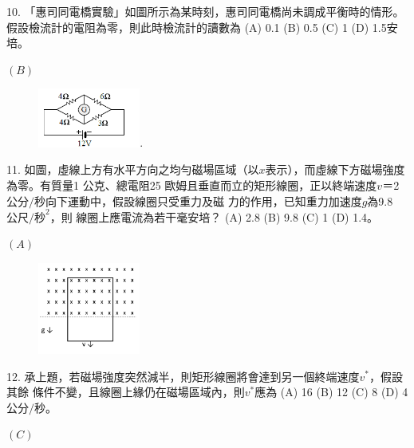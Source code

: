 \documentclass[cn,10pt,math=newtx]{elegantbook}
\begin{document}
\begin{example}
   10. 「惠司同電橋實驗」如圖所示為某時刻，惠司同電橋尚未調成平衡時的情形。假設檢流計的電阻為零，則此時檢流計的讀數為 (A) 0.1 (B) 0.5 (C) 1 (D) 1.5安培。\\
    \rightline{[全國聯招教甄109]}
\end{example}
\begin{solution}
    $(B)$
\end{solution}
\begin{figure}[htbp]
    \flushright
    \includegraphics[width=0.3\textwidth]{image/109全國10.png}.
  \end{figure}
\newpage


\begin{example}
   11. 如圖，虛線上方有水平方向之均勻磁場區域（以$x$表示），而虛線下方磁場強度為零。有質量1 公克、總電阻25 歐姆且垂直而立的矩形線圈，正以終端速度$v＝$2 $公分/秒$向下運動中，假設線圈只受重力及磁
力的作用，已知重力加速度$g$為9.8$公尺/秒^2$，則
線圈上應電流為若干毫安培？ (A) 2.8 (B) 9.8
(C) 1 (D) 1.4。\\
    \rightline{[全國聯招教甄109]}
\end{example}
\begin{solution}
    $(A)$
\end{solution}
\begin{figure}[htbp]
    \flushright
    \includegraphics[width=0.3\textwidth]{image/109全國11.png}
  \end{figure}
\newpage


\begin{example}
   12. 承上題，若磁場強度突然減半，則矩形線圈將會達到另一個終端速度$v^*$，假設其餘
條件不變，且線圈上緣仍在磁場區域內，則$v^*$應為 (A) 16 (B) 12 (C) 8 (D) 4 $公分/秒$。\\
    \rightline{[全國聯招教甄109]}
\end{example}
\begin{solution}
    $(C)$
\end{solution}
\end{document}
